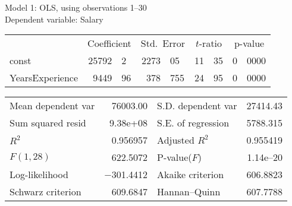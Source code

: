 \documentclass[11pt]{article}
\begin{document}
\thispagestyle{empty}

\begin{center}

Model 1: OLS, using observations 1--30\\
Dependent variable: Salary\\

\vspace{1em}

\begin{tabular}{lr@{.}lr@{.}lr@{.}lr@{.}l}
  &
 \multicolumn{2}{c}{Coefficient} &
  \multicolumn{2}{c}{Std.\ Error} &
   \multicolumn{2}{c}{$t$-ratio} &
    \multicolumn{2}{c}{p-value} \\[1ex]
const &
  25792&2 &
    2273&05 &
      11&35 &
        0&0000 \\
YearsExperience &
  9449&96 &
    378&755 &
      24&95 &
        0&0000 \\
\end{tabular}

\vspace{1ex}
\begin{tabular}{lrlr}
Mean dependent var &  76003.00 & S.D. dependent var &  27414.43 \\
Sum squared resid &  9.38\textrm{e+08} & S.E. of regression &  5788.315 \\
$R^2$ &  0.956957 & Adjusted $R^2$ &  0.955419 \\
$F(1, 28)$ &  622.5072 & P-value($F$) &  1.14\textrm{e--20} \\
Log-likelihood & $-$301.4412 & Akaike criterion &  606.8823 \\
Schwarz criterion &  609.6847 & Hannan--Quinn &  607.7788 \\
\end{tabular}


\end{center}
\end{document}
